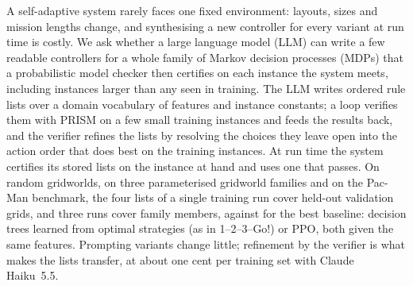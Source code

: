 A self-adaptive system rarely faces one fixed environment: layouts, sizes and mission lengths change, and
synthesising a new controller for every variant at run time is costly. We ask whether a large language model (LLM)
can write a few readable controllers for a whole family of Markov decision processes (MDPs) that a probabilistic
model checker then certifies on each instance the system meets, including instances larger than any seen in
training. The LLM writes ordered rule lists over a domain vocabulary of features and instance constants; a loop
verifies them with PRISM on a few small training instances and feeds the results back, and the verifier refines the
lists by resolving the choices they leave open into the action order that does best on the training instances.
At run time the system certifies its stored lists on the instance at hand and uses one that passes. On random
gridworlds, on three parameterised gridworld families and on the Pac-Man benchmark, the four lists of a single
training run cover  held-out validation grids, and three runs cover  family members, against
 for the best baseline: decision trees learned from optimal strategies (as in 1--2--3--Go!) or PPO, both
given the same features. Prompting variants change little; refinement by the verifier is what makes the lists
transfer, at about one cent per training set with Claude Haiku~5.5.
